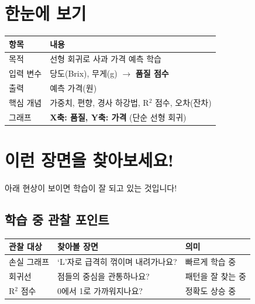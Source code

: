 \documentclass[11pt, a4paper]{article}
\begin{document}
\section{한눈에 보기}

\begin{center}
\begin{tabular}{lp{10cm}}
    \toprule
    \textbf{항목} & \textbf{내용} \\
    \midrule
    목적 & 선형 회귀로 사과 가격 예측 학습 \\
    입력 변수 & 당도(Brix), 무게(g) $\rightarrow$ \textbf{품질 점수} \\
    출력 & 예측 가격(원) \\
    핵심 개념 & 가중치, 편향, 경사 하강법, R$^2$ 점수, 오차(잔차) \\
    그래프 & \textbf{X축: 품질, Y축: 가격} (단순 선형 회귀) \\
    \bottomrule
\end{tabular}
\end{center}

\section{이런 장면을 찾아보세요!}

\begin{infobox}
아래 현상이 보이면 학습이 잘 되고 있는 것입니다!
\end{infobox}

\subsection{학습 중 관찰 포인트}

\begin{center}
\begin{tabular}{lp{6cm}l}
    \toprule
    \textbf{관찰 대상} & \textbf{찾아볼 장면} & \textbf{의미} \\
    \midrule
    손실 그래프 & `L'자로 급격히 꺾이며 내려가나요? & 빠르게 학습 중 \\
    회귀선 & 점들의 중심을 관통하나요? & 패턴을 잘 찾는 중 \\
    R$^2$ 점수 & 0에서 1로 가까워지나요? & 정확도 상승 중 \\
    \bottomrule
\end{tabular}
\end{center}
\end{document}

